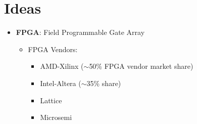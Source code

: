 \documentclass{article}
\begin{document}
\section{Ideas}
\begin{itemize}[label={\textbullet}, left=0.25cm]
    \item \textbf{FPGA}: Field Programmable Gate Array
    \begin{itemize}[label={--}, left=0.25cm]
        \item FPGA Vendors:
        \begin{itemize}[label={$\cdot$}, left=0.25cm]
            \item AMD-Xilinx ($\sim$50\% FPGA vendor market share)
            \item Intel-Altera ($\sim$35\% share)
            \item Lattice
            \item Microsemi
        \end{itemize}
    \end{itemize}


\end{itemize}
\end{document}
